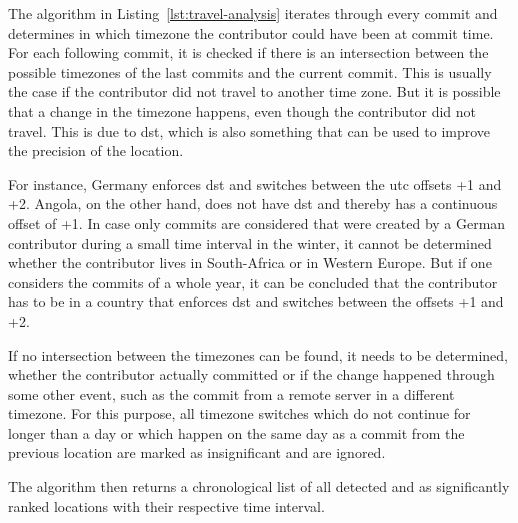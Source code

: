 The algorithm in Listing~\ref{lst:travel-analysis} iterates through every commit and determines in which timezone the contributor could have been at commit time.
For each following commit, it is checked if there is an intersection between the possible timezones of the last commits and the current commit.
This is usually the case if the contributor did not travel to another time zone.
But it is possible that a change in the timezone happens, even though the contributor did not travel.
This is due to \ac{dst}, which is also something that can be used to improve the precision of the location.

For instance, Germany enforces \ac{dst} and switches between the \ac{utc} offsets +1 and +2. Angola, on the other hand, does not have \ac{dst} and thereby has a continuous offset of +1.
In case only commits are considered that were created by a German contributor during a small time interval in the winter, it cannot be determined whether the contributor lives in South-Africa or in Western Europe.
But if one considers the commits of a whole year, it can be concluded that the contributor has to be in a country that enforces \ac{dst} and switches between the offsets +1 and +2.

If no intersection between the timezones can be found, it needs to be determined, whether the contributor actually committed or if the change happened through some other event, such as the commit from a remote server in a different timezone.
For this purpose, all timezone switches which do not continue for longer than a day or which happen on the same day as a commit from the previous location are marked as insignificant and are ignored.

The algorithm then returns a chronological list of all detected and as significantly ranked locations with their respective time interval.



